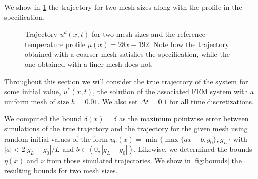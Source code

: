 \documentclass[oribibl]{llncs/llncs}
\begin{document}
We show in \cref{fig:ex1_evolution} the trajectory for two mesh sizes along with the
profile in the specification.

\begin{figure}[!t]
    \centering 
        \hfill
        \hfill
    \caption{Trajectory $u^d(x, t)$ for two mesh sizes and the reference
        temperature profile $\mu(x) = 28x - 192$. Note how the trajectory
        obtained with a coarser mesh satisfies the specification, while the one
        obtained with a finer mesh does not.}
    \label{fig:ex1_evolution}
\end{figure}


Throughout this
section we will consider the true trajectory of the system for some initial
value, $u^*(x, t)$, the solution of the associated FEM system with a uniform mesh of
size $h = 0.01$. We also set $\Delta t = 0.1$ for all time discretizations.

We computed the bound $\delta(x) = \delta$ as the maximum pointwise
error between simulations of the true trajectory and the trajectory for the
given mesh using random initial values of the form $u_0(x) = \min\{\max\{a x +
b, g_0\}, g_L\}$ with $|a| < 2 |g_L - g_0| / L$ and $b \in (0, |g_L - g_0|)$.
Likewise, we determined the bounds $\eta(x)$ and $\nu$ from those simulated
trajectories. We show in \cref{fig:bounds} the resulting bounds for two mesh
sizes.
\end{document}
